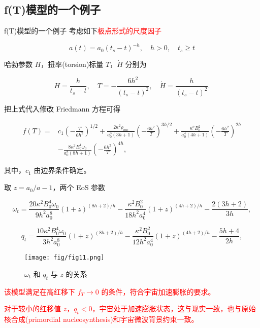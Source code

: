 \documentclass[9pt, dvipsnames]{beamer} %
\begin{document}
\subsection{f(T)模型的一个例子}

\begin{frame}{f(T)模型的一个例子}
    考虑如下\textcolor{red}{极点形式的尺度因子}

    $$
    a(t)
    =a_0\left(t_s-t \right)^{-h},\quad
    h>0,\quad t_s\geqslant t
    $$

    哈勃参数 $H$，扭率(torsion)标量 $T$，$\dot{{H}}$ 分别为

    $$
    H = \frac{h }{t_s - t } ,\quad
    T = -\frac{6h^2 }{\left(t_s-t \right)^2 } ,\quad
    \dot{H} = \frac{h }{\left(t_s - t \right)^2 }.
    $$

    把上式代入修改 Friedmann 方程可得

    $$
    \begin{aligned}
        f(T)
        =&c_1\left(-\frac{T }{6h^2 }  \right)^{1/2} + \frac{2\kappa^2 \rho_{m0} }{a_0^3\left(3h+1 \right) } \left(-\frac{6h^2 }{T }  \right)^{3h/2} + \frac{\kappa^2 B_0^2 }{a_0^4\left(4h+1 \right) } \left(-\frac{6h^2 }{T }  \right)^{2h} \\
        &- \frac{8\kappa^2 B_0^4 \omega_0 }{a_0^8 \left(8h+1 \right) } \left(-\frac{6h^2 }{T }  \right)^{4h},
    \end{aligned}
    $$

    其中，$c_1$ 由边界条件确定。

\end{frame}

\begin{frame}
    取 $z=a_0/a - 1$，两个 EoS 参数

    $$
    \omega_t
    =\frac{20\kappa^2 B_0^4 \omega_0 }{9h^2a_0^8 } \left(1+z \right)^{(8h+2)/h} - \frac{\kappa^2 B_0^2 }{18h^2 a_0^4 } (1+z)^{(4h+2)/h} - \frac{2(3h+2) }{3h } ,
    $$

    $$
    q_t
    =\frac{10\kappa^2 B_0^4 \omega_0 }{3h^2 a_0^8 } (1+z)^{(8h+2)/h} - \frac{\kappa^2 B_0^2 }{12 h^2 a_0^4 } (1+z)^{(4h+2)/h} - \frac{5h+4 }{2h } ,
    $$

    \begin{figure}
        \centering
        \texttt{[image: fig/fig11.png]}
        \caption{$\omega_t$ 和 $q_t$ 与 $z$ 的关系}
    \end{figure}

    \textcolor{red}{该模型满足在高红移下 $f_T\to 0$ 的条件，符合宇宙加速膨胀的要求。}

    \textcolor{red}{对于较小的红移值 $z$，$q_t<0$，宇宙处于加速膨胀状态，这与现实一致，也与原始核合成(primordial nucleosynthesis)和宇宙微波背景约束一致。}


    
\end{frame}
\end{document}
